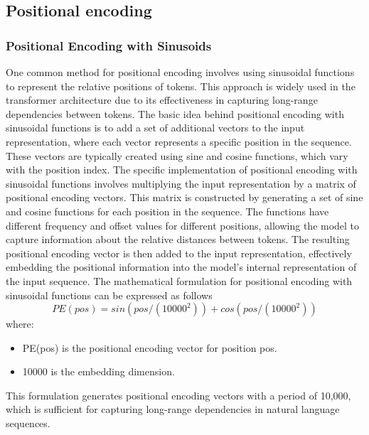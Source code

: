 \documentclass{article}
\begin{document}
\subsection{Positional encoding } 
\subsubsection{Positional Encoding with Sinusoids}
One common method for positional encoding involves using sinusoidal functions to represent the relative positions of tokens. This approach is widely used in the transformer architecture due to its effectiveness in capturing long-range dependencies between tokens.
The basic idea behind positional encoding with sinusoidal functions is to add a set of additional vectors to the input representation, where each vector represents a specific position in the sequence. These vectors are typically created using sine and cosine functions, which vary with the position index.
The specific implementation of positional encoding with sinusoidal functions involves multiplying the input representation by a matrix of positional encoding vectors. This matrix is constructed by generating a set of sine and cosine functions for each position in the sequence. The functions have different frequency and offset values for different positions, allowing the model to capture information about the relative distances between tokens.
The resulting positional encoding vector is then added to the input representation, effectively embedding the positional information into the model's internal representation of the input sequence.
The mathematical formulation for positional encoding with sinusoidal functions can be expressed as follows \\
\[ PE(pos) = sin(pos / (10000^2)) + cos(pos / (10000^2)) \]
where:
\begin{itemize}
    \item PE(pos) is the positional encoding vector for position pos.
    \item 10000 is the embedding dimension.
\end{itemize}
This formulation generates positional encoding vectors with a period of 10,000, which is sufficient for capturing long-range dependencies in natural language sequences.
\end{document}
